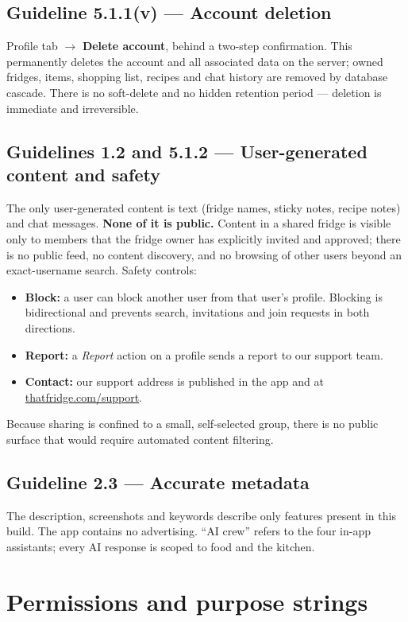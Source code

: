 \documentclass[11pt]{article}
\begin{document}
\subsection{Guideline 5.1.1(v) --- Account deletion}
Profile tab $\rightarrow$ \textbf{Delete account}, behind a two-step confirmation. This
permanently deletes the account and all associated data on the server; owned fridges,
items, shopping list, recipes and chat history are removed by database cascade. There is no
soft-delete and no hidden retention period --- deletion is immediate and irreversible.

\subsection{Guidelines 1.2 and 5.1.2 --- User-generated content and safety}
The only user-generated content is text (fridge names, sticky notes, recipe notes) and chat
messages. \textbf{None of it is public.} Content in a shared fridge is visible only to
members that the fridge owner has explicitly invited and approved; there is no public feed,
no content discovery, and no browsing of other users beyond an exact-username search.
Safety controls:
\begin{itemize}
  \item \textbf{Block:} a user can block another user from that user's profile. Blocking is
        bidirectional and prevents search, invitations and join requests in both
        directions.
  \item \textbf{Report:} a \emph{Report} action on a profile sends a report to our support
        team.
  \item \textbf{Contact:} our support address is published in the app and at
        \href{https://thatfridge.com/support}{thatfridge.com/support}.
\end{itemize}
Because sharing is confined to a small, self-selected group, there is no public surface
that would require automated content filtering.

\subsection{Guideline 2.3 --- Accurate metadata}
The description, screenshots and keywords describe only features present in this build. The
app contains no advertising. ``AI crew'' refers to the four in-app assistants; every AI
response is scoped to food and the kitchen.

\section{Permissions and purpose strings}
\end{document}
